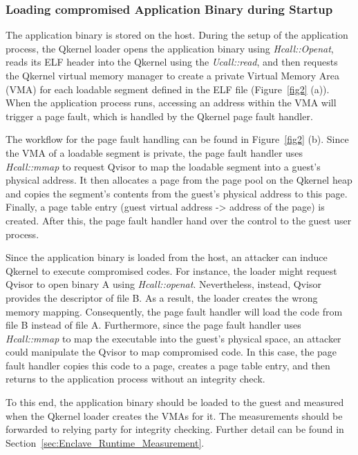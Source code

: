 \subsubsection{Loading compromised Application Binary during Startup}
\label{sec:app_binary_loading}
The application binary is stored on the host. During the setup of the application process, the Qkernel loader opens the application binary using \emph{Hcall::Openat}, reads its ELF header into the Qkernel using the \emph{Ucall::read}, and then requests the Qkernel virtual memory manager to create a private 
Virtual Memory Area (\acrshort{VMA}) for each loadable segment defined in the ELF file (Figure~\ref{fig2} (a)). When the application process runs, accessing an address within the \acrshort{VMA} will trigger a page fault, which is handled by the Qkernel page fault handler.
 
The workflow for the page fault handling can be found in Figure~\ref{fig2} (b). Since the \acrshort{VMA} of a loadable segment is private, the page fault handler uses \emph{Hcall::mmap} to request Qvisor to map the loadable segment into a guest's physical address. It then allocates a 
page from the page pool on the Qkernel heap and copies the segment's contents from the guest's physical address to this page. Finally, a page table entry (guest virtual address -> address of the page) is created. After this, the page fault handler hand over the control to the guest user process.
 
Since the application binary is loaded from the host,  an attacker can induce Qkernel to execute compromised codes. For instance, the loader might request Qvisor to open binary A using \emph{Hcall::openat}. Nevertheless, instead, Qvisor provides the descriptor of file B. As a result, the loader creates the 
wrong memory mapping. Consequently, the page fault handler will load the code from file B instead of file A. Furthermore, since the page fault handler uses \emph{Hcall::mmap} to map the executable into the guest's physical space, an attacker could manipulate the Qvisor to map compromised code. In this case, 
the page fault handler copies this code to a page, creates a page table entry, and then returns to the application process without an integrity check.  
 
To this end, the application binary should be loaded to the guest and measured when the Qkernel loader creates the \acrshort{VMA}s for it. The measurements should be forwarded to relying party for integrity checking. Further detail can be found in Section~\ref{sec:Enclave_Runtime_Measurement}. 

